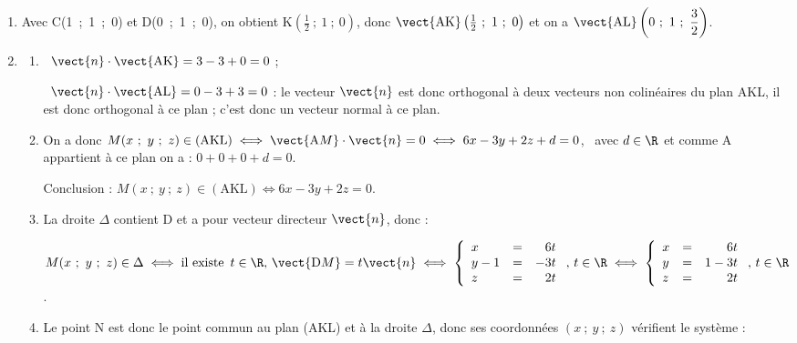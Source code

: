 \begin{enumerate}
\item %
Avec C(1~;~1~;~0) et D(0~;~1~;~0), on obtient K$\left(\frac{1}{2}~;~1~;~0\right)$, donc $\vect{\text{AK}}\left(\frac{1}{2}~;~1~;~0\right)$ et on a $\vect{\text{AL}}\left(0~;~1~;~\dfrac{3}{2}\right)$.
\item  
	\begin{enumerate}
		\item %
\starredbullet~$\vect{n} \cdot \vect{\text{AK}} = 3 - 3 + 0 = 0$ ;

\starredbullet~$\vect{n} \cdot \vect{\text{AL}} = 0 - 3 + 3 = 0$ : le vecteur $\vect{n}$ est donc orthogonal à deux vecteurs non colinéaires du plan AKL, il est donc orthogonal à ce plan ; c'est donc un vecteur normal à ce plan.
		\item %
On a donc $M(x~;~y~;~z) \in (\text{AKL}) \iff \vect{\text{A}M} \cdot \vect{n} = 0 \iff 6x - 3y + 2z + d = 0$, \, avec $d \in \R$  et comme A appartient à ce plan on a : $ 0 + 0 + 0 + d = 0$.

Conclusion : $M(x~;~y~;~z) \in (\text{AKL}) \iff 6x - 3y + 2z = 0$.
		\item %
La droite $\Delta$ contient D et a pour vecteur directeur $\vect{n}$, donc :

$M(x~;~y~;~z) \in \Delta \iff \text{il existe }\, t \in \R, \, \vect{\text{D}M} = t\vect{n} \iff \left\{\begin{array}{l c r}
x		&=&6t\\
y - 1	&=&-3t\\
z		&=&2t
\end{array}\right.,\, t \in \R \iff \left\{\begin{array}{l c r}
x		&=&6t\\
y		&=&1-3t\\
z		&=&2t
\end{array}\right.,\, t \in \R$.
		\item %
		Le point N est donc le point commun au plan (AKL) et à la droite $\Delta$, donc ses coordonnées $(x~;~y~;~z)$ vérifient le système :
		

\end{enumerate}
\end{enumerate}
